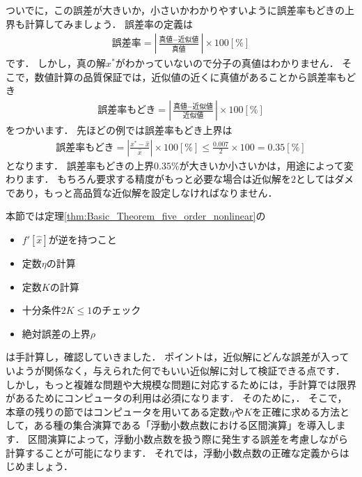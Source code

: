 ついでに，この誤差が大きいか，小さいかわかりやすいように誤差率もどきの上界も計算してみましょう．
誤差率の定義は
\begin{align*}
	\mbox{誤差率} = \left| \frac{  \mbox{真値} - \mbox{近似値}  }{ \mbox{真値} } \right| \times 100 [\%]
\end{align*}
です．
しかし，真の解$x^*$がわかっていないので分子の真値はわかりません．
そこで，数値計算の品質保証では，近似値の近くに真値があることから誤差率もどき
\begin{align*}
	\mbox{誤差率もどき} = \left| \frac{  \mbox{真値} - \mbox{近似値}  }{ \mbox{近似値} } \right| \times 100 [\%]
\end{align*}
をつかいます．
先ほどの例では誤差率もどき上界は
\begin{align*}
	\mbox{誤差率もどき} = \left| \frac{ x^* - \hat{x}  }{ \hat{x} } \right| \times 100 [\%] \le \frac{0.007}{2}\times 100 = 0.35 [\%]
\end{align*}
となります．
誤差率もどきの上界$0.35$\%が大きいか小さいかは，用途によって変わります．
もちろん要求する精度がもっと必要な場合は近似解を$2$としてはダメであり，もっと高品質な近似解を設定しなければなりません．

本節では定理\ref{thm:Basic_Theorem_five_order_nonlinear}の
\begin{itemize}
	\item $f'[\hat{x}]$が逆を持つこと
	\item 定数$\eta$の計算
	\item 定数$K$の計算
	\item 十分条件$2K \le 1$のチェック
	\item 絶対誤差の上界$\rho$
\end{itemize}
は手計算し，確認していきました．
ポイントは，近似解にどんな誤差が入っていようが関係なく，与えられた何でもいい近似解に対して検証できる点です．
しかし，もっと複雑な問題や大規模な問題に対応するためには，手計算では限界があるためにコンピュータの利用は必須になります．
そのために，．
そこで，本章の残りの節ではコンピュータを用いてある定数$\eta$や$K$を正確に求める方法として，ある種の集合演算である「浮動小数点数における区間演算」を導入します．
区間演算によって，浮動小数点数を扱う際に発生する誤差を考慮しながら計算することが可能になります．
それでは，浮動小数点数の正確な定義からはじめましょう．


%
%
